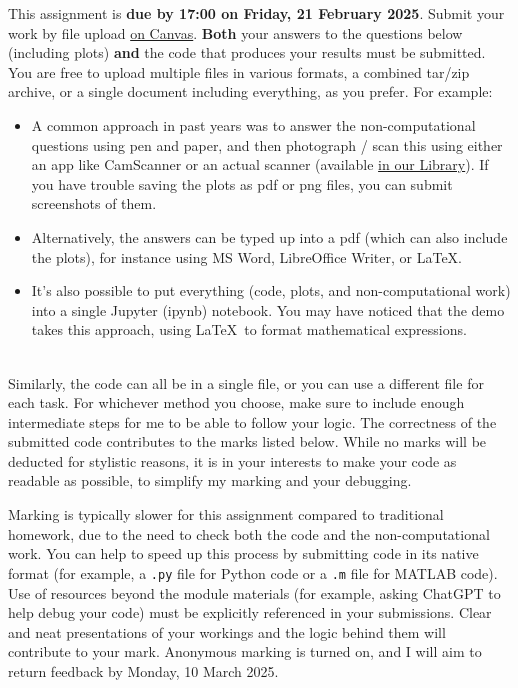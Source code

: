 \documentclass[12 pt]{article} %
\begin{document}
This assignment is \textbf{due by 17:00 on Friday, 21 February 2025}.
Submit your work by file upload \href{https://canvas.liverpool.ac.uk/courses/76365/assignments/297930}{on Canvas}.
\textbf{Both} your answers to the questions below (including plots) \textbf{and} the code that produces your results must be submitted.
You are free to upload multiple files in various formats, a combined tar/zip archive, or a single document including everything, as you prefer.
For example:
 \\[-30 pt]
\begin{itemize}
  \setlength{\itemsep}{1pt}
  \setlength{\parskip}{0pt}
  \setlength{\parsep}{0pt}
\item A common approach in past years was to answer the non-computational questions using pen and paper, and then photograph / scan this using either an app like CamScanner or an actual scanner (available \href{https://libanswers.liverpool.ac.uk/faq/49444}{in our Library}).  If you have trouble saving the plots as pdf or png files, you can submit screenshots of them.
  \item Alternatively, the answers can be typed up into a pdf (which can also include the plots), for instance using MS Word, LibreOffice Writer, or \LaTeX.
  \item It's also possible to put everything (code, plots, and non-computational work) into a single Jupyter (ipynb) notebook.  You may have noticed that the demo takes this approach, using \LaTeX\ to format mathematical expressions.
\end{itemize}
\ \\[-30 pt]
Similarly, the code can all be in a single file, or you can use a different file for each task.
For whichever method you choose, make sure to include enough intermediate steps for me to be able to follow your logic.
The correctness of the submitted code contributes to the marks listed below.
While no marks will be deducted for stylistic reasons, it is in your interests to make your code as readable as possible, to simplify my marking and your debugging.

Marking is typically slower for this assignment compared to traditional homework, due to the need to check both the code and the non-computational work.
You can help to speed up this process by submitting code in its native format (for example, a \texttt{.py} file for Python code or a \texttt{.m} file for MATLAB code).
Use of resources beyond the module materials (for example, asking ChatGPT to help debug your code) must be explicitly referenced in your submissions.
Clear and neat presentations of your workings and the logic behind them will contribute to your mark.
Anonymous marking is turned on, and I will aim to return feedback by Monday, 10 March 2025.
\end{document}
